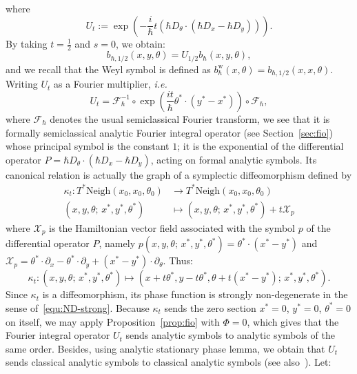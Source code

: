 \documentclass{article}
\newcommand{\Vois}{\mathrm{Neigh}}
\newcommand{\w}{\mathrm{w}}
\newcommand{\h}{\hbar}
\newcommand{\ham}[1]{\mathcal{X}_{#1}}
\begin{document}
where
\[
U_t := \exp \left( -\dfrac{i}{\hbar} t \left( \hbar D_{ \theta} \cdot
    \left( \hbar D_x - \hbar D_y \right)\right) \right).
\]
By taking $ t= \frac{1}{2}$ and $s=0$, we obtain:
\[
b_{ \hbar, 1/2} \left( x, y, \theta \right) = U_{1/2} b_{ \hbar}(x, y,
\theta),
\]
and we recall that the Weyl symbol is defined as
$b_\h^{\w}(x,\theta) = b_{ \hbar, 1/2}(x, x, \theta)$.  Writing $U_t$
as a Fourier multiplier, \emph{i.e.}
\begin{equation}
  \label{equ:Ut}
  U_{t}=\mathcal{F}_\h^{-1}\circ \exp \left(\frac{it}{\h}\theta^* \cdot
    (y^*-x^*) \right)\circ \mathcal{ F}_\h ,
\end{equation}
where $\mathcal{F}_\h$ denotes the usual semiclassical Fourier
transform, we see that it is formally semiclassical analytic Fourier
integral operator (see Section~\ref{sec:fio}) whose principal symbol
is the constant $1$; it is the exponential of the differential
operator $P= \hbar D_{ \theta}\cdot ( \hbar D_x - \hbar D_y)$, acting
on formal analytic symbols.  Its canonical relation is actually the
graph of a symplectic diffeomorphism defined by
\begin{align}
  \kappa_t: T^*  \Vois(x_0, x_0, \theta_0) & \longrightarrow T^*  \Vois(x_0, x_0, \theta_0) \\
  (x, y, \theta;\, x^*, y^*, \theta^*) & \longmapsto (x, y, \theta;\, x^*, y^*, \theta^*) + t \ham{p} 
\end{align}
where $\ham{p}$ is the Hamiltonian vector field associated with the
symbol $p$ of the differential operator $P$, namely
$p(x, y, \theta;\, x^*, y^*, \theta^*) = \theta^*\cdot (x^* - y^*)$
and
$\ham{p} = \theta^*\cdot \partial_x - \theta^* \cdot \partial_y + (x^*
- y^*)\cdot \partial_{ \theta}$. Thus:
\begin{equation} \label{equa_transfo_canonique_kappa_t} \kappa_t: (x,
  y, \theta;\, x^*, y^*, \theta^*) \mapsto (x+ t \theta^*, y-t
  \theta^*, \theta + t(x^*-y^*);\, x^*, y^*, \theta^* ).
\end{equation}
Since $\kappa_t$ is a diffeomorphism, its phase function is strongly
non-degenerate in the sense of~\eqref{equ:ND-strong}.  Because
$ \kappa_t$ sends the zero section $x^*=0$, $y^*=0$, $\theta^*=0$ on
itself, we may apply Proposition~\ref{prop:fio} with $\Phi=0$, which
gives that the Fourier integral operator $U_t$ sends analytic symbols
to analytic symbols of the same order.  Besides, using analytic
stationary phase lemma, we obtain that $U_t$ sends classical analytic
symbols to classical analytic symbols (see also~\cite{sj-96}).  Let:
\end{document}
